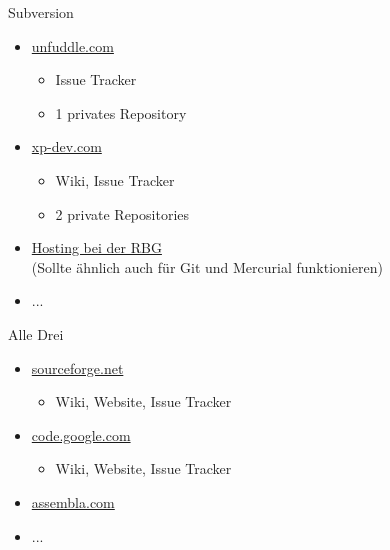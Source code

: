 \documentclass[presentation]{beamer}
\begin{document}
\begin{frame}{Subversion}
  \begin{itemize}
  \item<1-> \href{http://unfuddle.com}{unfuddle.com}
    \begin{itemize}
    \item Issue Tracker
    \item 1 privates Repository
    \end{itemize}
  \item<2-> \href{http://xp-dev.com}{xp-dev.com}
    \begin{itemize}
    \item Wiki, Issue Tracker
    \item 2 private Repositories
    \end{itemize}
  \item<3->
    \href{http://www.rbg.informatik.tu-darmstadt.de/onlinehilfe/freigaben/k\#svn}{Hosting
      bei der RBG}\\(Sollte ähnlich auch für Git und Mercurial funktionieren)
  \item<4-> ...
  \end{itemize}
\end{frame}
\begin{frame}{Alle Drei}
  \begin{itemize}
  \item<1-> \href{http://sourceforge.net}{sourceforge.net}
    \begin{itemize}
    \item Wiki, Website, Issue Tracker
    \end{itemize}
  \item \href{http://code.google.com}{code.google.com}
    \begin{itemize}
    \item Wiki, Website, Issue Tracker
    \end{itemize}
  \item \href{http://assembla.com}{assembla.com}
  \item ...
  \end{itemize}
\end{frame}
\end{document}
